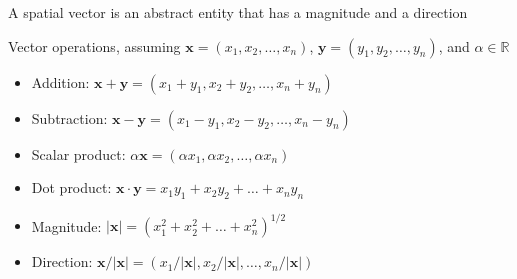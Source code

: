\documentclass[8pt,a4paper,compress]{beamer}
\begin{document}
\begin{frame}[fragile]
\pause

\begin{minipage}{200pt}
A spatial vector is an abstract entity that has a magnitude and a direction
\end{minipage}%
\hfill
\begin{minipage}{100pt}
\begin{center}
\end{center}
\end{minipage}%

\pause
\bigskip

Vector operations, assuming $\mathbf{x}=(x_1,x_2,\dots,x_n)$, $\mathbf{y}=(y_1,y_2,\dots,y_n)$, and $\alpha \in \mathbb{R}$
\begin{itemize}
\pause
\item Addition: $\mathbf{x}+\mathbf{y}=(x_1+y_1,x_2+y_2,\dots,x_n+y_n)$
\pause
\item Subtraction: $\mathbf{x}-\mathbf{y}=(x_1-y_1,x_2-y_2,\dots,x_n-y_n)$
\pause
\item Scalar product: $\alpha\mathbf{x}=(\alpha x_1,\alpha x_2,\dots,\alpha x_n)$
\pause
\item Dot product: $\mathbf{x}\cdot\mathbf{y}=x_1y_1+x_2y_2+\dots+x_ny_n$
\pause
\item Magnitude: $|\mathbf{x}|=(x_1^2+x_2^2+\dots+x_n^2)^{1/2}$
\pause
\item Direction: $\mathbf{x}/|\mathbf{x}|=(x_1/|\mathbf{x}|,x_2/|\mathbf{x}|,\dots,x_n/|\mathbf{x}|)$
\end{itemize}
\end{frame}
\end{document}
